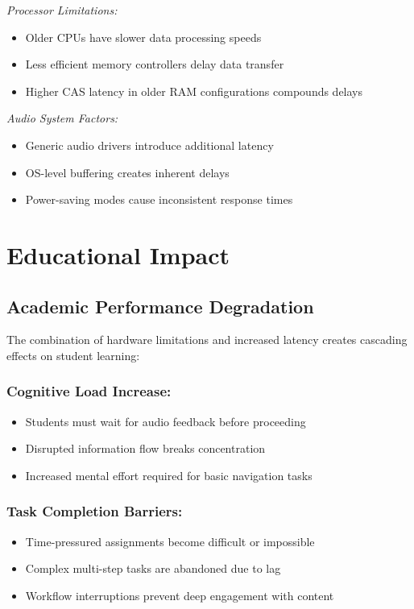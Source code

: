 \emph{Processor Limitations:}
\begin{itemize}
    \item Older CPUs have slower data processing speeds
    \item Less efficient memory controllers delay data transfer
    \item Higher CAS latency in older RAM configurations compounds delays
\end{itemize}

\emph{Audio System Factors:}
\begin{itemize}
    \item Generic audio drivers introduce additional latency
    \item OS-level buffering creates inherent delays
    \item Power-saving modes cause inconsistent response times
\end{itemize}

\section{Educational Impact}\label{educational-impact}

\subsection{Academic Performance Degradation}\label{academic-performance-degradation}

The combination of hardware limitations and increased latency creates cascading effects on student learning:

\subsubsection{Cognitive Load Increase:}
\begin{itemize}
    \item Students must wait for audio feedback before proceeding
    \item Disrupted information flow breaks concentration
    \item Increased mental effort required for basic navigation tasks
\end{itemize}

\subsubsection{Task Completion Barriers:}

\begin{itemize}
\item Time-pressured assignments become difficult or impossible
\item Complex multi-step tasks are abandoned due to lag
\item Workflow interruptions prevent deep engagement with content
\end{itemize}

